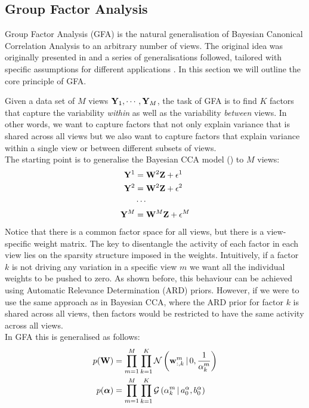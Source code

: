 \subsection{Group Factor Analysis} \label{section:gfa}

Group Factor Analysis (GFA) is the natural generalisation of Bayesian Canonical Correlation Analysis to an arbitrary number of views.
The original idea was originally presented in \cite{Virtanen2012} and a series of generalisations followed, tailored with specific assumptions for different applications \cite{Klami2015,Leppaaho2017,Bunte2016,Khan2014,Zhao2016,Remes2015}. In this section we will outline the core principle of GFA.

Given a data set of $M$ views ${\bf Y}_1, \cdots, {\bf Y}_M$, the task of GFA is to find $K$ factors that capture the variability \textit{within} as well as the variability \textit{between} views. In other words, we want to capture factors that not only explain variance that is shared across all views but we also want to capture factors that explain variance within a single view or between different subsets of views.\\
The starting point is to generalise the Bayesian CCA model () to $M$ views:
\begin{align*}
	{\bf Y}^{1} &= {\bf W}^{2} {\bf Z} + \epsilon^{1} \\
	{\bf Y}^{2} &= {\bf W}^{2} {\bf Z} + \epsilon^{2} \\
	& \cdots \\
	{\bf Y}^{M} &= {\bf W}^{M} {\bf Z} + \epsilon^{M}
\end{align*}
Notice that there is a common factor space for all views, but there is a view-specific weight matrix. The key to disentangle the activity of each factor in each view lies on the sparsity structure imposed in the weights. Intuitively, if a factor $k$ is not driving any variation in a specific view $m$ we want all the individual weights to be pushed to zero. As shown before, this behaviour can be achieved using Automatic Relevance Determination (ARD) priors. However, if we were to use the same approach as in Bayesian CCA, where the ARD prior for factor $k$ is shared across all views, then factors would be restricted to have the same activity across all views.\\
In GFA this is generalised as follows:
\begin{align}
	p({\bf W}) &= \prod_{m=1}^{M} \prod_{k=1}^{K} \mathcal{N}\left({\bf w}_{:,k}^m \,|\, 0,\frac{1}{\alpha_k^m}\right) \\
	p(\mbox{\boldmath $\alpha$}) &= \prod_{m=1}^{M} \prod_{k=1}^{K} \mathcal{G}\left(\alpha_k^m \,|\, a_0^\alpha, b_0^\alpha\right)
\end{align}
